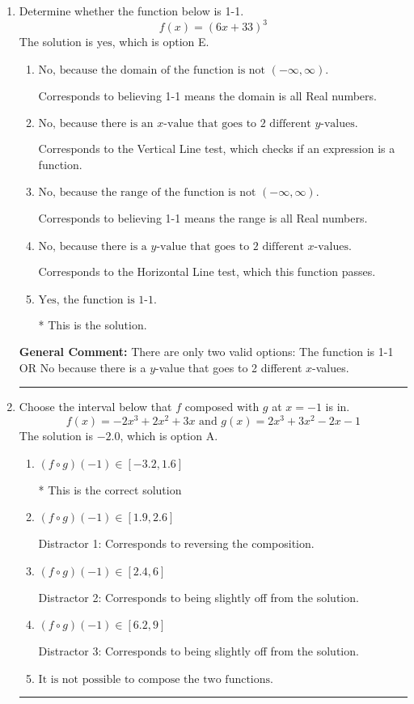 \documentclass{extbook}[14pt]
\newcommand{\litem}[1]{\item #1

\rule{\textwidth}{0.4pt}}
\begin{document}
\begin{enumerate}\litem{
Determine whether the function below is 1-1.
\[ f(x) = (6 x + 33)^3 \]The solution is \( \text{yes} \), which is option E.\begin{enumerate}[label=\Alph*.]
\item \( \text{No, because the domain of the function is not $(-\infty, \infty)$.} \)

Corresponds to believing 1-1 means the domain is all Real numbers.
\item \( \text{No, because there is an $x$-value that goes to 2 different $y$-values.} \)

Corresponds to the Vertical Line test, which checks if an expression is a function.
\item \( \text{No, because the range of the function is not $(-\infty, \infty)$.} \)

Corresponds to believing 1-1 means the range is all Real numbers.
\item \( \text{No, because there is a $y$-value that goes to 2 different $x$-values.} \)

Corresponds to the Horizontal Line test, which this function passes.
\item \( \text{Yes, the function is 1-1.} \)

* This is the solution.
\end{enumerate}

\textbf{General Comment:} There are only two valid options: The function is 1-1 OR No because there is a $y$-value that goes to 2 different $x$-values.
}
\litem{
Choose the interval below that $f$ composed with $g$ at $x=-1$ is in.
\[ f(x) = -2x^{3} +2 x^{2} +3 x \text{ and } g(x) = 2x^{3} +3 x^{2} -2 x -1 \]The solution is \( -2.0 \), which is option A.\begin{enumerate}[label=\Alph*.]
\item \( (f \circ g)(-1) \in [-3.2, 1.6] \)

* This is the correct solution
\item \( (f \circ g)(-1) \in [1.9, 2.6] \)

 Distractor 1: Corresponds to reversing the composition.
\item \( (f \circ g)(-1) \in [2.4, 6] \)

 Distractor 2: Corresponds to being slightly off from the solution.
\item \( (f \circ g)(-1) \in [6.2, 9] \)

 Distractor 3: Corresponds to being slightly off from the solution.
\item \( \text{It is not possible to compose the two functions.} \)



\end{enumerate}}
\end{enumerate}
\end{document}
